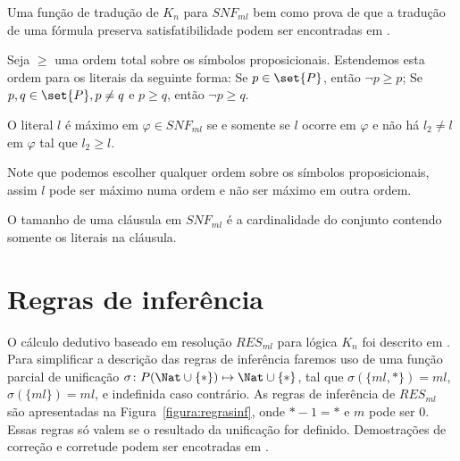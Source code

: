 Uma função de tradução de $K_n$ para $SNF_{ml}$ bem como prova de que a tradução de uma fórmula preserva satisfatibilidade podem ser encontradas em \cite{nalontocl}.

Seja $\ge$ uma ordem total sobre os símbolos proposicionais. Estendemos esta ordem para os literais da seguinte forma: Se $p \in \set{P}$, então $\neg p \ge p$; Se $p, q \in \set{P}, p \not= q$ e $p \ge q$, então $\neg p \ge q$.

\begin{definition}
	O literal $l$ é máximo em $\varphi \in SNF_{ml}$ se e somente se $l$ ocorre em $\varphi$ e não há $l_2 \not= l$ em $\varphi$ tal que $l_2 \ge l$.
\end{definition}

Note que podemos escolher qualquer ordem sobre os símbolos proposicionais, assim $l$ pode ser máximo numa ordem e não ser máximo em outra ordem.

\begin{definition}
	O tamanho de uma cláusula em $SNF_{ml}$ é a cardinalidade do conjunto contendo somente os literais na cláusula.
\end{definition}

\section{Regras de inferência} \label{secao:regrasinf}
O cálculo dedutivo baseado em resolução $RES_{ml}$ para lógica $K_n$ foi descrito em \cite{nalontocl}. Para simplificar a descrição das regras de inferência faremos uso de uma função parcial de unificação $\sigma \colon P(\Nat \cup \{*\}) \mapsto \Nat \cup \{*\}$, tal que $\sigma(\{ml, *\}) = ml$, $\sigma(\{ml\}) = ml$, e indefinida caso contrário. As regras de inferência de $RES_{ml}$ são apresentadas na Figura~\ref{figura:regrasinf}, onde $*-1=*$ e $m$ pode ser 0. Essas regras só valem se o resultado da unificação for definido. Demostrações de correção e corretude podem ser encotradas em \cite{nalontocl}.

